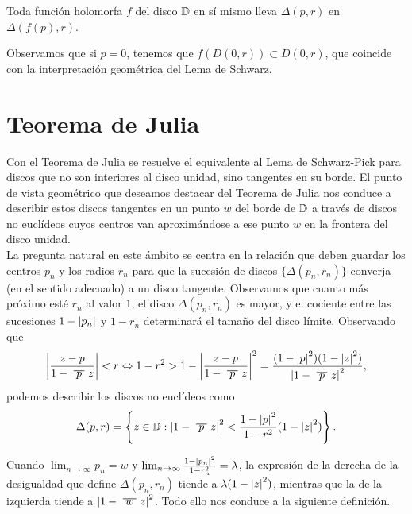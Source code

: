 \begin{theorem}
    Toda función holomorfa $f$ del disco $\mathbb{D}$ en sí mismo lleva $\Delta(p,r)$ en $\Delta(f(p),r)$.
\end{theorem}

Observamos que si $p = 0$, tenemos que $f(D(0,r)) \subset D(0,r)$, que coincide con la interpretación geométrica del Lema de Schwarz. \\

\section{Teorema de Julia}

Con el Teorema de Julia se resuelve el equivalente al Lema de Schwarz-Pick para discos que no son interiores al disco unidad, sino tangentes en su borde. El punto de vista geométrico que deseamos destacar del Teorema de Julia nos conduce a describir estos discos tangentes en un punto $w$ del borde de $\mathbb{D}$ a través de discos no euclídeos cuyos centros van aproximándose a ese punto $w$ en la frontera del disco unidad. \\

La pregunta natural en este ámbito se centra en la relación que deben guardar los centros $p_n$ y los radios $r_n$ para que la sucesión de discos $\{\Delta(p_n, r_n)\}$ converja (en el sentido adecuado) a un disco tangente. Observamos que cuanto más próximo esté $r_n$ al valor $1$, el disco $\Delta(p_n, r_n)$ es mayor, y el cociente entre las sucesiones $1 - \left\lvert p_n\right\rvert$ y $1 - r_n$ determinará el tamaño del disco límite. Observando que
\begin{equation*}
    \abs{\frac{z-p}{1 - \xbar{p}z}} < r \Leftrightarrow 1 - r^2 > 1 -  \abs{\frac{z-p}{1 - \xbar{p}z}}^2 = \frac{(1-\abs{p}^2)(1-\abs{z}^2)}{\abs{1-\xbar{p}z}^2},
\end{equation*}
podemos describir los discos no euclídeos como
\begin{equation*}
\Delta(p,r) = \left\{z \in \disk : \abs{1-\xbar{p}z}^2 < \frac{1-\abs{p}^2}{1-r^2} (1-\abs{z}^2)\right\}.
\end{equation*}

Cuando $\lim_{n \to \infty} p_n = w$ y $\lim_{n \to \infty} \frac{1-\left\lvert p_n\right\rvert^2}{1-r_n^2} = \lambda$, la expresión de la derecha de la desigualdad que define $\Delta(p_n, r_n)$ tiende a $\lambda(1 - \left\lvert z\right\rvert^2)$, mientras que la de la izquierda tiende a $\abs{1 - \xbar{w}z}^2$. Todo ello nos conduce a la siguiente definición. \\

